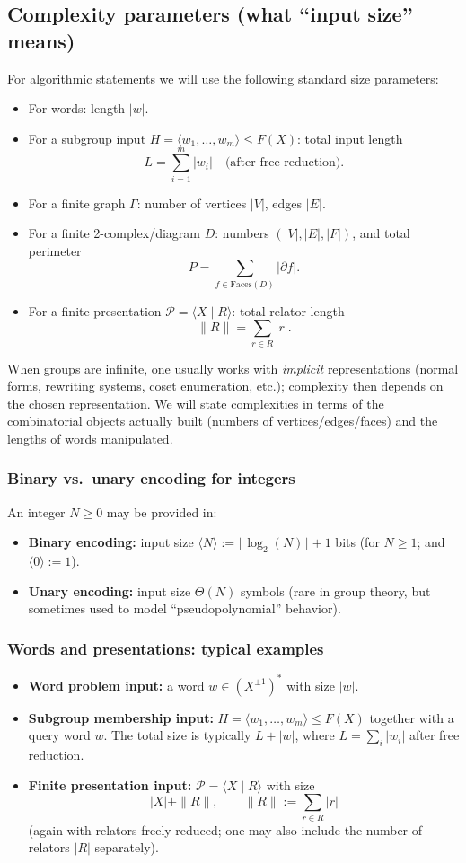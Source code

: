 \documentclass[11pt]{article}
\theoremstyle{definition}
\theoremstyle{plain}
\theoremstyle{remark}
\newcommand{\Faces}{\mathrm{Faces}}
\begin{document}
\subsection{Complexity parameters (what ``input size'' means)}
For algorithmic statements we will use the following standard size parameters:
\begin{itemize}[leftmargin=2em]
\item For words: length $|w|$.
\item For a subgroup input $H=\langle w_1,\dots,w_m\rangle\le F(X)$: total input length
\[
L=\sum_{i=1}^m |w_i| \quad \text{(after free reduction).}
\]
\item For a finite graph $\Gamma$: number of vertices $|V|$, edges $|E|$.
\item For a finite 2-complex/diagram $D$: numbers $(|V|,|E|,|F|)$, and total perimeter
\[
P=\sum_{f\in \Faces(D)} |\partial f|.
\]
\item For a finite presentation $\mathcal P=\langle X\mid R\rangle$: total relator length
\[
\|R\|=\sum_{r\in R} |r|.
\]
\end{itemize}
When groups are infinite, one usually works with \emph{implicit} representations (normal forms, rewriting systems, coset enumeration, etc.);
complexity then depends on the chosen representation. We will state complexities in terms of the combinatorial objects actually built (numbers of vertices/edges/faces) and the lengths of words manipulated.


\subsubsection*{Binary vs.\ unary encoding for integers}
An integer $N\ge 0$ may be provided in:
\begin{itemize}[leftmargin=2em]
\item \textbf{Binary encoding:} input size $\langle N\rangle := \lfloor \log_2(N)\rfloor+1$ bits (for $N\ge 1$; and $\langle 0\rangle:=1$).
\item \textbf{Unary encoding:} input size $\Theta(N)$ symbols (rare in group theory, but sometimes used to model ``pseudopolynomial'' behavior).
\end{itemize}
\subsubsection*{Words and presentations: typical examples}
\begin{itemize}[leftmargin=2em]
\item \textbf{Word problem input:} a word $w\in (X^{\pm1})^*$ with size $|w|$.
\item \textbf{Subgroup membership input:} $H=\langle w_1,\dots,w_m\rangle\le F(X)$ together with a query word $w$.
The total size is typically $L+|w|$, where $L=\sum_i |w_i|$ after free reduction.
\item \textbf{Finite presentation input:} $\mathcal P=\langle X\mid R\rangle$ with size
\[
|X|+\|R\|,\qquad \|R\|:=\sum_{r\in R}|r|
\]
(again with relators freely reduced; one may also include the number of relators $|R|$ separately).
\end{itemize}
\end{document}
